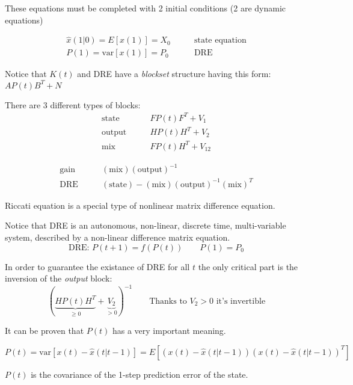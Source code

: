 These equations must be completed with 2 initial conditions (2 are dynamic equations)

\begin{align*}
    \hat{x}(1|0) = E[x(1)] = X_0 & \qquad\text{state equation} \\
    P(1) = \text{var}[x(1)] = P_0 & \qquad\text{DRE}
\end{align*}

\begin{rem}
    Notice that $K(t)$ and DRE have  a \emph{blockset} structure having this form: $AP(t)B^T+N$

    There are 3 different types of blocks:
    \begin{align*}
        \text{state} \qquad& FP(t)F^T+V_1 \\
        \text{output} \qquad& HP(t)H^T+V_2 \\
        \text{mix} \qquad& FP(t)H^T+V_{12}
    \end{align*}

    \begin{align*}
        \text{gain} \qquad& (\text{mix})(\text{output})^{-1} \\
        \text{DRE} \qquad& (\text{state}) - (\text{mix})(\text{output})^{-1}(\text{mix})^T
    \end{align*}
\end{rem}

\begin{rem}
    Riccati equation is a special type of nonlinear matrix difference equation.

    Notice that DRE is an autonomous, non-linear, discrete time, multi-variable system, described by a non-linear difference matrix equation.
    \[
        \text{DRE: } P(t+1) = f(P(t)) \qquad P(1) = P_0
    \]
\end{rem}

\begin{rem}
    In order to guarantee the existance of DRE for all $t$ the only critical part is the inversion of the \emph{output} block:
    \[
        ( \underbrace{HP(t)H^T}_{\ge 0} + \underbrace{V_2}_{>0})^{-1} \qquad \text{Thanks to $V_2>0$ it's invertible}
    \]
\end{rem}

\begin{rem}[Meaning of $P(t)$]
    It can be proven that $P(t)$ has a very important meaning.

    \[
        P(t) = \text{var}[x(t) - \hat{x}(t|t-1)] = E[(x(t) - \hat{x}(t|t-1))(x(t) - \hat{x}(t|t-1))^T]
    \]

    $P(t)$ is the covariance of the 1-step prediction error of the state.
\end{rem}
